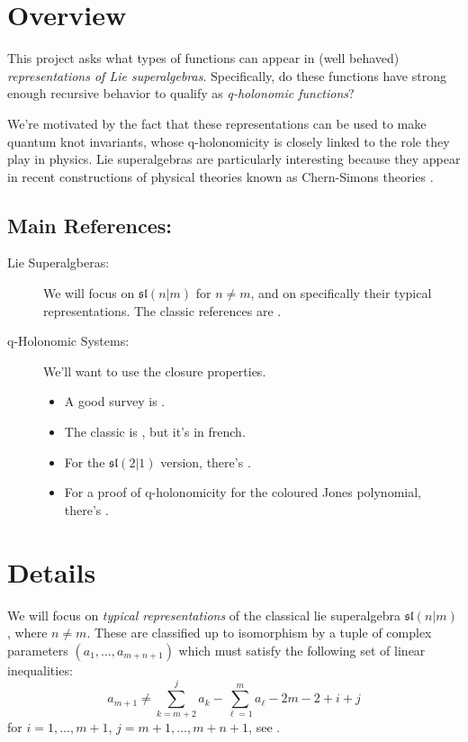 \documentclass[a4paper]{article}
\begin{document}
\vspace{1cm}

\section*{Overview}
This project asks what types of functions can appear in (well behaved) \emph{representations of Lie superalgebras}.
Specifically, do these functions have strong enough recursive behavior to qualify as \emph{q-holonomic functions}?

We're motivated by the fact that these representations can be used to make quantum knot invariants, whose q-holonomicity is closely linked to the role they play in physics.
Lie superalgebras are particularly interesting because they appear in recent constructions of physical theories known as Chern-Simons theories \cite{Mikhaylov_Witten_2015}.

\subsection*{Main References:}

\begin{description}
  \item[Lie Superalgberas:] We will focus on $\mathfrak{sl}(n|m)$ for $n \neq m$, and on specifically their typical representations.
    The classic references are \cite{Kac1977,Kac_1978}.

  \item[q-Holonomic Systems:]
  We'll want to use the closure properties.
    \begin{itemize}
     \item A good survey is \cite{Garoufalidis_Le_2016}.
     \item The classic is \cite{Sabbah_1993}, but it's in french. 
     \item For the $\mathfrak{sl}(2|1)$ version, there's \cite{Brown_Geer_2024}.
     \item For a proof of q-holonomicity for the coloured Jones polynomial, there's \cite{Garoufalidis_Le_2005}.
  \end{itemize}
\end{description}

\section*{Details}

We will focus on \emph{typical representations} of the classical lie superalgebra $\mathfrak{sl}(n|m)$, where $n \neq m$.
These are classified up to isomorphism by a tuple of complex parameters $(a_1,\ldots,a_{m+n+1})$ which must satisfy the following set of linear inequalities:
\begin{equation}
  a_{m+1} \neq \sum_{k=m+2}^j a_k - \sum_{\ell = 1}^m a_\ell -2m - 2 + i + j
\end{equation}
for $i = 1,\ldots,m+1$, $j = m+1,\ldots, m+n+1$, see \cite[Example 1, pg 620]{Kac_1978}.
\end{document}
